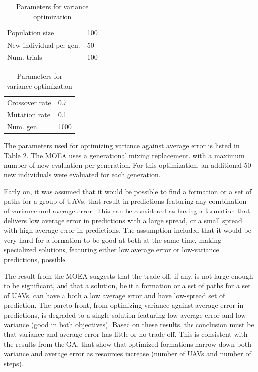\documentclass[10pt,a4paper]{book}
\begin{document}
\begin{table}[H]
\centering
\caption{Parameters for variance optimization}
\begin{minipage}{50mm}
\small
\begin{tabular}{l l}
Population size & 100   \\  
New individual per gen. & 50  \\
Num. trials & 100  

\end{tabular}
\end{minipage}
\centering
\begin{minipage}{50mm}
\small
\begin{tabular}{l l}
Crossover rate & 0.7 \\ 
Mutation rate & 0.1  \\ 
Num. gen. & 1000  

\end{tabular}

\end{minipage}

\label{TAB_MOEA_VAR_PARAMS}
\end{table}

The parameters used for optimizing variance against average error is listed in Table \ref{TAB_MOEA_VAR_PARAMS}. The \gls{MOEA} uses a generational mixing replacement, with a maximum number of new evaluation per generation. For this optimization, an additional 50 new individuals were evaluated for each generation.

Early on, it was assumed that it would be possible to find a formation or a set of paths for a group of \glspl{UAV}, that result in predictions featuring any combination of variance and average error. This can be considered as having a formation that delivers low average error in predictions with a large spread, or a small spread with high average error in predictions. The assumption included that it would be very hard for a formation to be good at both at the same time, making specialized solutions, featuring either low average error or low-variance predictions, possible. 

The result from the \gls{MOEA} suggests that the trade-off, if any, is not large enough to be significant, and that a solution, be it a formation or a set of paths for a set of \glspl{UAV}, can have a both a low average error and have low-spread set of prediction. The pareto front, from optimizing variance against average error in predictions, is degraded to a single solution featuring low average error and low variance (good in both objectives). Based on these results, the conclusion must be that variance and average error has little or no trade-off. This is consistent with the results from the \gls{GA}, that show that optimized formations narrow down both variance and average error as resources increase (number of \glspl{UAV} and number of steps).
\end{document}
